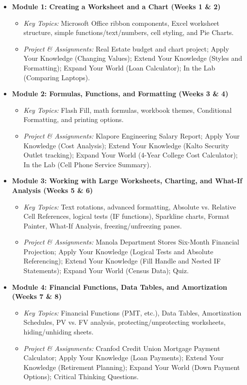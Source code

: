 \documentclass[11pt,a4paper]{article}
\begin{document}
\begin{itemize}[leftmargin=*]
    \item \textbf{Module 1: Creating a Worksheet and a Chart (Weeks 1 \& 2)}
    \begin{itemize}
        \item \textit{Key Topics:} Microsoft Office ribbon components, Excel worksheet structure, simple functions/text/numbers, cell styling, and Pie Charts.
        \item \textit{Project \& Assignments:} Real Estate budget and chart project; Apply Your Knowledge (Changing Values); Extend Your Knowledge (Styles and Formatting); Expand Your World (Loan Calculator); In the Lab (Comparing Laptops).
    \end{itemize}
    
    \item \textbf{Module 2: Formulas, Functions, and Formatting (Weeks 3 \& 4)}
    \begin{itemize}
        \item \textit{Key Topics:} Flash Fill, math formulas, workbook themes, Conditional Formatting, and printing options.
        \item \textit{Project \& Assignments:} Klapore Engineering Salary Report; Apply Your Knowledge (Cost Analysis); Extend Your Knowledge (Kalto Security Outlet tracking); Expand Your World (4-Year College Cost Calculator); In the Lab (Cell Phone Service Summary).
    \end{itemize}

    \item \textbf{Module 3: Working with Large Worksheets, Charting, and What-If Analysis (Weeks 5 \& 6)}
    \begin{itemize}
        \item \textit{Key Topics:} Text rotations, advanced formatting, Absolute vs. Relative Cell References, logical tests (IF functions), Sparkline charts, Format Painter, What-If Analysis, freezing/unfreezing panes.
        \item \textit{Project \& Assignments:} Manola Department Stores Six-Month Financial Projection; Apply Your Knowledge (Logical Tests and Absolute Referencing); Extend Your Knowledge (Fill Handle and Nested IF Statements); Expand Your World (Census Data); Quiz.
    \end{itemize}

    \item \textbf{Module 4: Financial Functions, Data Tables, and Amortization (Weeks 7 \& 8)}
    \begin{itemize}
        \item \textit{Key Topics:} Financial Functions (PMT, etc.), Data Tables, Amortization Schedules, PV vs. FV analysis, protecting/unprotecting worksheets, hiding/unhiding sheets.
        \item \textit{Project \& Assignments:} Cranfod Credit Union Mortgage Payment Calculator; Apply Your Knowledge (Loan Payments); Extend Your Knowledge (Retirement Planning); Expand Your World (Down Payment Options); Critical Thinking Questions.
    \end{itemize}


\end{itemize}
\end{document}
